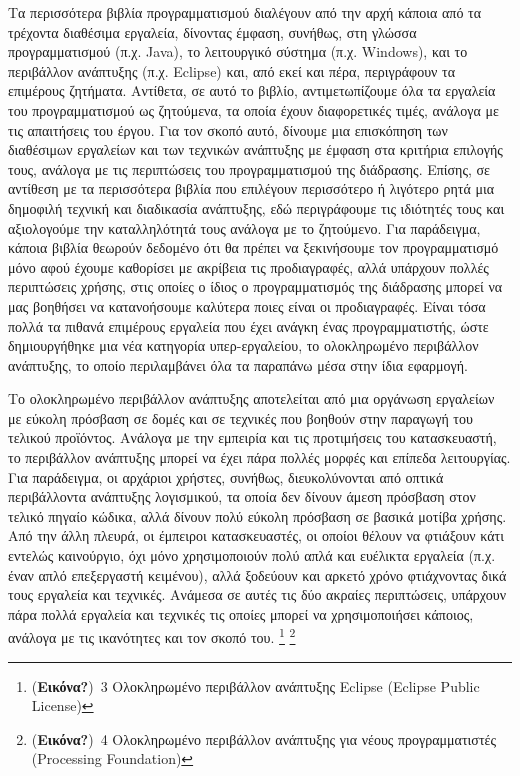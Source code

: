 \documentclass[
]{article}
\begin{document}
Τα περισσότερα βιβλία προγραμματισμού διαλέγουν από την αρχή κάποια από
τα τρέχοντα διαθέσιμα εργαλεία, δίνοντας έμφαση, συνήθως, στη γλώσσα
προγραμματισμού (π.χ. Java), το λειτουργικό σύστημα (π.χ. Windows), και
το περιβάλλον ανάπτυξης (π.χ. Eclipse) και, από εκεί και πέρα,
περιγράφουν τα επιμέρους ζητήματα. Αντίθετα, σε αυτό το βιβλίο,
αντιμετωπίζουμε όλα τα εργαλεία του προγραμματισμού ως ζητούμενα, τα
οποία έχουν διαφορετικές τιμές, ανάλογα με τις απαιτήσεις του έργου. Για
τον σκοπό αυτό, δίνουμε μια επισκόπηση των διαθέσιμων εργαλείων και των
τεχνικών ανάπτυξης με έμφαση στα κριτήρια επιλογής τους, ανάλογα με τις
περιπτώσεις του προγραμματισμού της διάδρασης. Επίσης, σε αντίθεση με τα
περισσότερα βιβλία που επιλέγουν περισσότερο ή λιγότερο ρητά μια
δημοφιλή τεχνική και διαδικασία ανάπτυξης, εδώ περιγράφουμε τις
ιδιότητές τους και αξιολογούμε την καταλληλότητά τους ανάλογα με το
ζητούμενο. Για παράδειγμα, κάποια βιβλία θεωρούν δεδομένο ότι θα πρέπει
να ξεκινήσουμε τον προγραμματισμό μόνο αφού έχουμε καθορίσει με ακρίβεια
τις προδιαγραφές, αλλά υπάρχουν πολλές περιπτώσεις χρήσης, στις οποίες ο
ίδιος ο προγραμματισμός της διάδρασης μπορεί να μας βοηθήσει να
κατανοήσουμε καλύτερα ποιες είναι οι προδιαγραφές. Είναι τόσα πολλά τα
πιθανά επιμέρους εργαλεία που έχει ανάγκη ένας προγραμματιστής, ώστε
δημιουργήθηκε μια νέα κατηγορία υπερ-εργαλείου, το ολοκληρωμένο
περιβάλλον ανάπτυξης, το οποίο περιλαμβάνει όλα τα παραπάνω μέσα στην
ίδια εφαρμογή.

Το ολοκληρωμένο περιβάλλον ανάπτυξης αποτελείται από μια οργάνωση
εργαλείων με εύκολη πρόσβαση σε δομές και σε τεχνικές που βοηθούν στην
παραγωγή του τελικού προϊόντος. Ανάλογα με την εμπειρία και τις
προτιμήσεις του κατασκευαστή, το περιβάλλον ανάπτυξης μπορεί να έχει
πάρα πολλές μορφές και επίπεδα λειτουργίας. Για παράδειγμα, οι αρχάριοι
χρήστες, συνήθως, διευκολύνονται από οπτικά περιβάλλοντα ανάπτυξης
λογισμικού, τα οποία δεν δίνουν άμεση πρόσβαση στον τελικό πηγαίο
κώδικα, αλλά δίνουν πολύ εύκολη πρόσβαση σε βασικά μοτίβα χρήσης. Από
την άλλη πλευρά, οι έμπειροι κατασκευαστές, οι οποίοι θέλουν να φτιάξουν
κάτι εντελώς καινούργιο, όχι μόνο χρησιμοποιούν πολύ απλά και ευέλικτα
εργαλεία (π.χ. έναν απλό επεξεργαστή κειμένου), αλλά ξοδεύουν και αρκετό
χρόνο φτιάχνοντας δικά τους εργαλεία και τεχνικές. Ανάμεσα σε αυτές τις
δύο ακραίες περιπτώσεις, υπάρχουν πάρα πολλά εργαλεία και τεχνικές τις
οποίες μπορεί να χρησιμοποιήσει κάποιος, ανάλογα με τις ικανότητες και
τον σκοπό του. \footnote{(\textbf{Εικόνα?})~3 Ολοκληρωμένο περιβάλλον
  ανάπτυξης Eclipse (Eclipse Public License)} \footnote{(\textbf{Εικόνα?})~4
  Ολοκληρωμένο περιβάλλον ανάπτυξης για νέους προγραμματιστές
  (Processing Foundation)}
\end{document}
